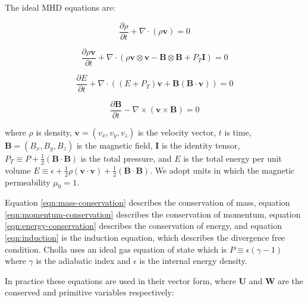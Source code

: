 The ideal MHD equations are:

\begin{equation}
    \label{eqn:mass-conservation}
    \frac{\partial \rho}{\partial t} + \nabla \cdot (\rho \boldsymbol{v}) = 0
\end{equation}

\begin{equation}
    \label{eqn:momentum-conservation}
    \frac{\partial \rho\boldsymbol{v}}{\partial t} + \nabla \cdot (\rho \boldsymbol{v}\otimes\boldsymbol{v} - \boldsymbol{B}\otimes\boldsymbol{B} + P_T\boldsymbol{I}) = 0
\end{equation}

\begin{equation}
    \label{eqn:energy-conservation}
    \frac{\partial E}{\partial t} + \nabla \cdot ( (E + P_T) \boldsymbol{v} + \boldsymbol{B}(\boldsymbol{B}\cdot\boldsymbol{v}) ) = 0
\end{equation}

\begin{equation}
    \label{eqn:induction}
    \frac{\partial \boldsymbol{B}}{\partial t} - \nabla \times (\boldsymbol{v} \times \boldsymbol{B}) = 0
\end{equation}

\noindent where $\rho$ is density, $\boldsymbol{v} = ( v_x, v_y, v_z)$ is the velocity vector, $t$ is time, $\boldsymbol{B} = ( B_x, B_y, B_z)$ is the magnetic field, $\boldsymbol{I}$ is the identity tensor, $P_T \equiv P + \frac{1}{2}(\boldsymbol{B} \cdot \boldsymbol{B})$ is the total pressure, and $E$ is the total energy per unit volume $E \equiv \epsilon + \frac{1}{2}\rho(\boldsymbol{v}\cdot\boldsymbol{v}) + \frac{1}{2}(\boldsymbol{B}\cdot\boldsymbol{B})$. We adopt units in which the magnetic permeability $\mu_0 = 1$. 

Equation \ref{eqn:mass-conservation} describes the conservation of mass, equation \ref{eqn:momentum-conservation} describes the conservation of momentum, equation \ref{eqn:energy-conservation} describes the conservation of energy, and equation \ref{eqn:induction} is the induction equation, which describes the divergence free condition. Cholla uses an ideal gas equation of state  which is $P \equiv \epsilon(\gamma - 1)$ where $\gamma$ is the adiabatic index and $\epsilon$ is the internal energy density. 

In practice these equations are used in their vector form, where $\boldsymbol{U}$ and $\boldsymbol{W}$ are the conserved and primitive variables respectively:

